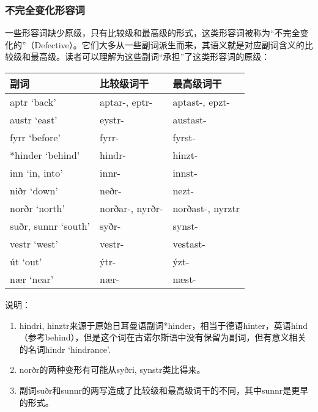 \subsubsection{不完全变化形容词}

一些形容词缺少原级，只有比较级和最高级的形式，这类形容词被称为“不完全变化的”（Defective）。它们大多从一些副词派生而来，其语义就是对应副词含义的比较级和最高级。读者可以理解为这些副词``承担''了这类形容词的原级：

\begin{longtable}{lll}
    \toprule
    副词                & 比较级词干      & 最高级词干       \\
    \midrule
    \endhead
    \bottomrule
    \endfoot
    aptr `back'         & aptar-, eptr-   & aptast-, epzt-   \\
    austr `east‌'        & eystr-          & austast-         \\
    fyrr `before‌'       & fyrr-           & fyrst-           \\
    *hinder `behind'    & hindr-          & hinzt-           \\
    inn `in, into‌'      & innr-           & innst-           \\
    niðr `down'         & neðr-           & nezt-            \\
    norðr `north‌'       & norðar-, nyrðr- & norðast-, nyrztr \\
    suðr, sunnr `south' & syðr-           & synst-           \\
    vestr `west'        & vestr-          & vestast-         \\
    út `out'            & ýtr-            & ýzt-             \\
    nær `near'          & nær-            & næst-            \\
\end{longtable}

说明：

\begin{enumerate}
    \item
          hindri,
          hinztr来源于原始日耳曼语副词*hinder，相当于德语hinter，英语hind（参考behind），但是这个词在古诺尔斯语中没有保留为副词，但有意义相关的名词hindr
          `hindrance'.
    \item
          norðr的两种变形有可能从syðri, synstr类比得来。
    \item
          副词suðr和sunnr的两写造成了比较级和最高级词干的不同，其中sunnr是更早的形式。
\end{enumerate}

